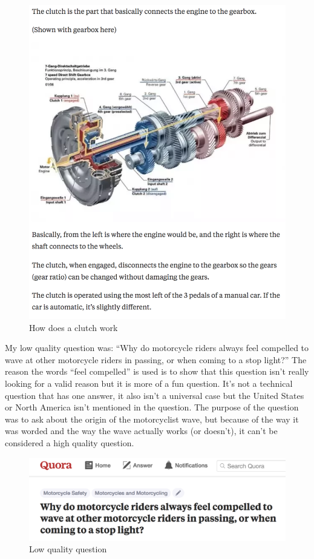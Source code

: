 \documentclass[10pt,letterpaper,bibliography=totoc]{scrartcl}
\begin{document}
\begin{figure}[h!]
\centering
\label{fig:clutch}
\includegraphics[scale=.5]{clutch.png}
\caption{How does a clutch work}
\end{figure}

My low quality question was: ``Why do motorcycle riders always feel compelled to wave at other motorcycle riders in passing, or when coming to a stop light?'' The reason the words ``feel compelled'' is used is to show that this question isn't really looking for a valid reason but it is more of a fun question. It's not a technical question that has one answer, it also isn't a universal case but the United States or North America isn't mentioned in the question. The purpose of the question was to ask about the origin of the motorcyclist wave, but because of the way it was worded and the way the wave actually works (or doesn't), it can't be considered a high quality question.

\begin{figure}[h!]
\centering
\label{fig:low_quality}
\includegraphics[scale=.5]{low_quality.png}
\caption{Low quality question}
\end{figure}
\end{document}
